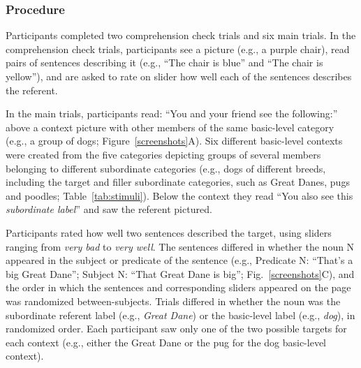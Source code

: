\documentclass[10pt,letterpaper]{article}
\begin{document}
\subsubsection{Procedure}
Participants completed two comprehension check trials and six main trials. In the comprehension check trials, participants see a picture (e.g., a purple chair), read pairs of sentences describing it (e.g., ``The chair is blue'' and ``The chair is yellow''), and are asked to rate on slider how well each of the sentences describes the referent.

In the main trials, participants read: ``You and your friend see the following:'' above a context picture with other members of the same basic-level category (e.g., a group of dogs; Figure~\ref{screenshots}A). 
Six different basic-level contexts were created from the five categories depicting groups of several members belonging to different subordinate categories (e.g., dogs of different breeds, including the target and filler subordinate categories, such as Great Danes, pugs and poodles; Table~\ref{tab:stimuli}).
Below the context they read ``You also see this \emph{subordinate label}'' and saw the referent pictured.

Participants rated how well two sentences described the target, using sliders ranging from \textit{very bad} to \textit{very well}. The sentences differed in whether the noun N appeared in the subject or predicate of the sentence (e.g., Predicate N: ``That's a big Great Dane''; Subject N: ``That Great Dane is big''; Fig.~\ref{screenshots}C), and the order in which the sentences and corresponding sliders appeared on the page was randomized between-subjects. 
Trials differed in whether the noun was the subordinate referent label (e.g., \emph{Great Dane}) or the basic-level label (e.g., \emph{dog}), in randomized order. 
Each participant saw only one of the two possible targets for each context (e.g., either the Great Dane or the pug for the dog basic-level context).
\end{document}
